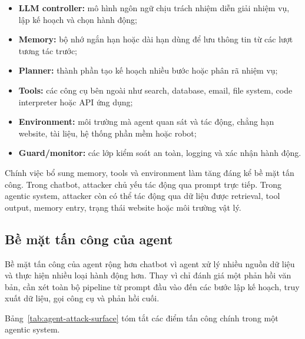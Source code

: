 \begin{itemize}[leftmargin=1.2cm]
    \item \textbf{LLM controller:}
    mô hình ngôn ngữ chịu trách nhiệm diễn giải nhiệm vụ, lập kế hoạch và
    chọn hành động;

    \item \textbf{Memory:}
    bộ nhớ ngắn hạn hoặc dài hạn dùng để lưu thông tin từ các lượt tương
    tác trước;

    \item \textbf{Planner:}
    thành phần tạo kế hoạch nhiều bước hoặc phân rã nhiệm vụ;

    \item \textbf{Tools:}
    các công cụ bên ngoài như search, database, email, file system, code
    interpreter hoặc API ứng dụng;

    \item \textbf{Environment:}
    môi trường mà agent quan sát và tác động, chẳng hạn website, tài liệu,
    hệ thống phần mềm hoặc robot;

    \item \textbf{Guard/monitor:}
    các lớp kiểm soát an toàn, logging và xác nhận hành động.
\end{itemize}

Chính việc bổ sung memory, tools và environment làm tăng đáng kể bề mặt tấn
công. Trong chatbot, attacker chủ yếu tác động qua prompt trực tiếp. Trong
agentic system, attacker còn có thể tác động qua dữ liệu được retrieval,
tool output, memory entry, trạng thái website hoặc môi trường vật lý.

\subsection{Bề mặt tấn công của agent}
\label{subsec:agent-attack-surface}

Bề mặt tấn công của agent rộng hơn chatbot vì agent xử lý nhiều nguồn dữ
liệu và thực hiện nhiều loại hành động hơn. Thay vì chỉ đánh giá một phản
hồi văn bản, cần xét toàn bộ pipeline từ prompt đầu vào đến các bước lập
kế hoạch, truy xuất dữ liệu, gọi công cụ và phản hồi cuối.

Bảng~\ref{tab:agent-attack-surface} tóm tắt các điểm tấn công chính trong
một agentic system.

